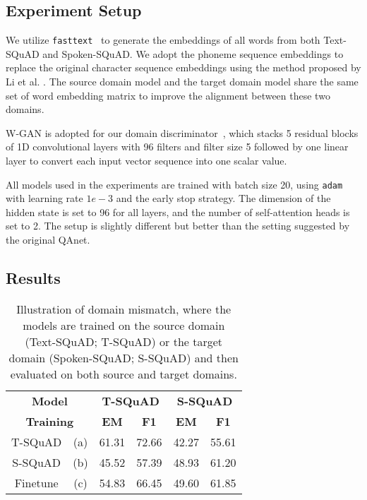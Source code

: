 \documentclass{article}
\begin{document}
\subsection{Experiment Setup} 

We utilize \texttt{fasttext}~\cite{bojanowski2016enriching} to generate the embeddings of all words from both Text-SQuAD and Spoken-SQuAD. 
We adopt the phoneme sequence embeddings to replace the original character sequence embeddings using the method proposed by Li et al. \cite{li2018spoken}.
The source domain model and the target domain model share the same set of word embedding matrix to improve the alignment between these two domains.  

W-GAN is adopted for our domain discriminator~\cite{gulrajani2017improved}, which stacks 5 residual blocks of 1D convolutional layers with 96 filters and filter size 5 followed by one linear layer to convert each input vector sequence into one scalar value. 

All models used in the experiments are trained with batch size 20, using \texttt{adam} with learning rate $1e-3$ and the early stop strategy.
The dimension of the hidden state is set to 96 for all layers, and the number of self-attention heads is set to 2.
The setup is slightly different but better than the setting suggested by the original QAnet.


\subsection{Results}

\begin{table}[t!]
\centering
\caption{Illustration of domain mismatch, where the models are trained on the source domain (Text-SQuAD; T-SQuAD) or the target domain (Spoken-SQuAD; S-SQuAD) and then evaluated on both source and target domains.}
\label{tab:domain}
\vspace{2mm}
\begin{tabular}{|c|c|c|c|c|c|}
\hline
\multicolumn{2}{|c|}{\bf Model}  &
\multicolumn{2}{|c|}{\bf T-SQuAD} &
\multicolumn{2}{|c|}{\bf S-SQuAD} \\
\cline{3-6}
\multicolumn{2}{|c|}{\bf Training} &\textbf{EM} & \textbf{F1} &\textbf{EM} & \textbf{F1} \\
\hline
\hline
T-SQuAD & (a) & 61.31 & 72.66 & 42.27 & 55.61 \\
S-SQuAD  & (b) & 45.52 & 57.39 & 48.93 & 61.20\\
\hline
Finetune & (c) & 54.83 & 66.45 & 49.60 & 61.85 \\
\hline
\end{tabular}
\end{table}
\end{document}
